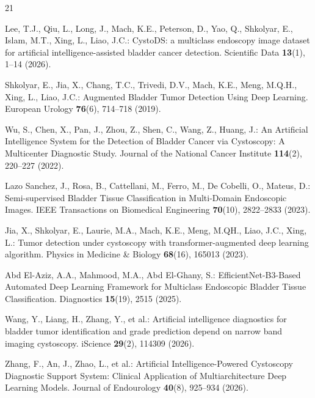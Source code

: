 \documentclass[runningheads]{llncs}
\begin{document}
%
%
\begin{thebibliography}{21}

Lee, T.J., Qiu, L., Long, J., Mach, K.E., Peterson, D., Yao, Q., Shkolyar, E., Islam, M.T., Xing, L., Liao, J.C.: CystoDS: a multiclass endoscopy image dataset for artificial intelligence-assisted bladder cancer detection. Scientific Data \textbf{13}(1), 1--14 (2026). 

Shkolyar, E., Jia, X., Chang, T.C., Trivedi, D.V., Mach, K.E., Meng, M.Q.H., Xing, L., Liao, J.C.: Augmented Bladder Tumor Detection Using Deep Learning. European Urology \textbf{76}(6), 714--718 (2019). 

Wu, S., Chen, X., Pan, J., Zhou, Z., Shen, C., Wang, Z., Huang, J.: An Artificial Intelligence System for the Detection of Bladder Cancer via Cystoscopy: A Multicenter Diagnostic Study. Journal of the National Cancer Institute \textbf{114}(2), 220--227 (2022). 

Lazo Sanchez, J., Rosa, B., Cattellani, M., Ferro, M., De Cobelli, O., Mateus, D.: Semi-supervised Bladder Tissue Classification in Multi-Domain Endoscopic Images. IEEE Transactions on Biomedical Engineering \textbf{70}(10), 2822--2833 (2023). 

Jia, X., Shkolyar, E., Laurie, M.A., Mach, K.E., Meng, M.QH., Liao, J.C., Xing, L.: Tumor detection under cystoscopy with transformer-augmented deep learning algorithm. Physics in Medicine \& Biology \textbf{68}(16), 165013 (2023). 

Abd El-Aziz, A.A., Mahmood, M.A., Abd El-Ghany, S.: EfficientNet-B3-Based Automated Deep Learning Framework for Multiclass Endoscopic Bladder Tissue Classification. Diagnostics \textbf{15}(19), 2515 (2025). 

Wang, Y., Liang, H., Zhang, Y., et al.: Artificial intelligence diagnostics for bladder tumor identification and grade prediction depend on narrow band imaging cystoscopy. iScience \textbf{29}(2), 114309 (2026). 

Zhang, F., An, J., Zhao, L., et al.: Artificial Intelligence-Powered Cystoscopy Diagnostic Support System: Clinical Application of Multiarchitecture Deep Learning Models. Journal of Endourology \textbf{40}(8), 925--934 (2026). 


\end{thebibliography}
\end{document}
